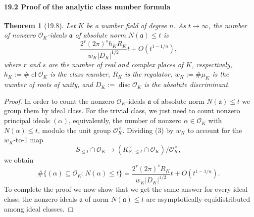 \documentclass[UTF8,11pt]{ctexart}
\newtheorem*{theorem}{Theorem}
\theoremstyle{definition}
\newcommand{\R}{\mathbb R}
\begin{document}
\paragraph{19.2 Proof of the analytic class number formula}
\begin{theorem}[19.8]
Let $K$ be a number field of degree $n$. As $t\to\infty$, the number of nonzero $\mathcal O_K$-ideals $\mathfrak a$ of absolute norm $N(\mathfrak a)\leq t$ is
\[
\frac{2^r(2\pi)^sh_KR_K}{w_K|D_K|^{1/2}}t+O(t^{1-1/n}),
\]
where $r$ and $s$ are the number of real and complex places of $K$, respectively, $h_K:=\#\operatorname{cl}\mathcal O_K$ is the class number, $R_K$ is the regulator, $w_K:=\#\mu_K$ is the number of roots of unity, and $D_K:=\operatorname{disc}\mathcal O_K$ is the absolute discriminant.
\end{theorem}
\begin{proof}
In order to count the nonzero $\mathcal O_K$-ideals $\mathfrak a$ of absolute norm $N(\mathfrak a)\leq t$ we group them by ideal class. For the trivial class, we just need to count nonzero principal ideals $(\alpha)$, equivalently, the number of nonzero $\alpha\in\mathcal O_K$ with $N(\alpha)\leq t$, modulo the unit group $\mathcal O_K^\times$. Dividing (3) by $w_K$ to account for the $w_K$-to-1 map
\[
S_{\leq t}\cap\mathcal O_K\longrightarrow(K_{\R,\leq t}^\times\cap\mathcal O_K)/\mathcal O_K^\times,
\]
we obtain
\[
\#\{(\alpha)\subseteq\mathcal O_K:N(\alpha)\leq t\}=\frac{2^r(2\pi)^sR_K}{w_K|D_K|^{1/2}}t+O(t^{1-1/n}).\tag{4}
\]
To complete the proof we now show that we get the same answer for every ideal class; the nonzero ideals $\mathfrak a$ of norm $N(\mathfrak a)\leq t$ are asymptotically equidistributed among ideal classes.


\end{proof}
\end{document}

